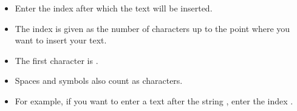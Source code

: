 \begin{itemize}
\item Enter the index after which the text will be inserted.
\item The index is given as the number of characters up to the point where you want to insert your text.
\item The first character is .
\item Spaces and symbols also count as  characters.
\item For example, if you want to enter a text after the string , enter the index .
\end{itemize}
